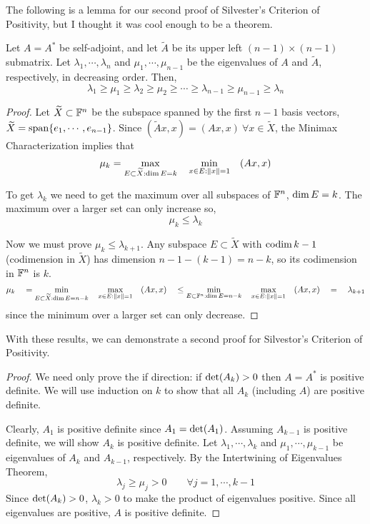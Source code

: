 The following is a lemma for our second proof of Silvester's Criterion of Positivity, but I thought it was cool enough to be a theorem. 

\begin{theorem}
Let $A = A^{*}$ be self-adjoint, and let $\widetilde{A}$ be its upper left $(n-1) \times (n-1)$ submatrix. Let $\lambda_{1}, \cdots, \lambda_{n}$ and $\mu_{1}, \cdots, \mu_{n-1}$ be the eigenvalues of $A$ and $\widetilde{A}$, respectively, in decreasing order. Then, 
$$\lambda_{1} \geq \mu_{1} \geq \lambda_{2} \geq \mu_{2} \geq \cdots \geq \lambda_{n-1} \geq \mu_{n-1} \geq \lambda_{n}$$
\end{theorem}

\begin{proof}
Let $\widetilde{X} \subset \mathbb{F}^{n}$ be the subspace spanned by the first $n-1$ basis vectors, $\widetilde{X} = \operatorname{span} \{e_{1}, \cdots, e_{n-1}\}$. Since $(\widetilde{A}x, x) = (Ax, x) \: \forall x \in \widetilde{X}$, the Minimax Characterization implies that 
$$\mu_{k} = \max_{E \subset \widetilde{X} : \operatorname{dim} E = k} \quad \min_{x \in E : \norm{x} = 1} \quad (Ax, x)$$

To get $\lambda_{k}$ we need to get the maximum over all subspaces of $\mathbb{F}^{n}$, $\operatorname{dim} E = k$. The maximum over a larger set can only increase so,
$$\mu_{k} \leq \lambda_{k}$$

Now we must prove $\mu_{k} \leq \lambda_{k+1}$. Any subspace $E \subset \widetilde{X}$ with $\operatorname{codim} k-1$ (codimension in $\widetilde{X}$) has dimension $n - 1 - (k - 1) = n - k$, so its codimension in $\mathbb{F}^{n}$ is $k$. 
$$\mu_{k} \quad = \min_{E \subset \widetilde{X} : \operatorname{dim} E = n - k} \quad \max_{x \in E : \norm{x} = 1} \quad (Ax, x) \quad \leq \min_{E \subset \mathbb{F}^{n} : \operatorname{dim} E = n - k} \quad \max_{x \in E : \norm{x} =1} \quad (Ax,x) \quad = \quad \lambda_{k+1}$$
since the minimum over a larger set can only decrease.
\end{proof}

With these results, we can demonstrate a second proof for Silvestor's Criterion of Positivity. 

\begin{proof}
We need only prove the if direction: if $\operatorname{det}(A_{k}) > 0$ then $A = A^{*}$ is positive definite. We will use induction on $k$ to show that all $A_{k}$ (including $A$) are positive definite. 

Clearly, $A_{1}$ is positive definite since $A_{1} = \operatorname{det}(A_{1})$. Assuming $A_{k-1}$ is positive definite, we will show $A_{k}$ is positive definite. Let $\lambda_{1}, \cdots, \lambda_{k}$ and $\mu_{1}, \cdots, \mu_{k-1}$ be eigenvalues of $A_{k}$ and $A_{k-1}$, respectively. By the Intertwining of Eigenvalues Theorem, 
$$\lambda_{j} \geq \mu_{j} > 0 \qquad \forall j = 1, \cdots, k-1$$
Since $\operatorname{det}(A_{k}) > 0$, $\lambda_{k} > 0$ to make the product of eigenvalues positive. Since all eigenvalues are positive, $A$ is positive definite. 
\end{proof}